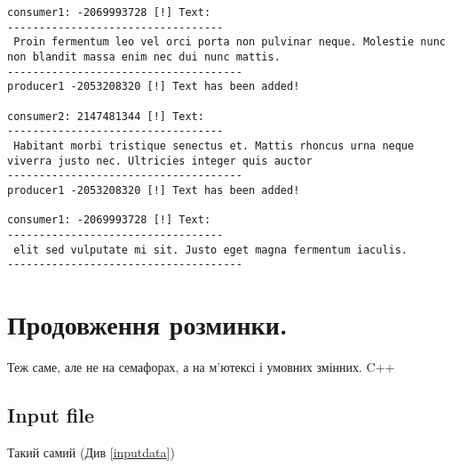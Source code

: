 \documentclass{article}
\begin{document}
\begin{verbatim}
consumer1: -2069993728 [!] Text: 
----------------------------------
 Proin fermentum leo vel orci porta non pulvinar neque. Molestie nunc non blandit massa enim nec dui nunc mattis. 
-------------------------------------
producer1 -2053208320 [!] Text has been added! 

consumer2: 2147481344 [!] Text: 
----------------------------------
 Habitant morbi tristique senectus et. Mattis rhoncus urna neque viverra justo nec. Ultricies integer quis auctor
-------------------------------------
producer1 -2053208320 [!] Text has been added! 

consumer1: -2069993728 [!] Text: 
----------------------------------
 elit sed vulputate mi sit. Justo eget magna fermentum iaculis.
-------------------------------------

\end{verbatim}


\newpage
\section{Продовження розминки.}
\large Теж саме, але не на семафорах, а на м’ютексі і
умовних змінних. 
C++

\subsection{Input file}

Такий самий (Див \ref{inputdata})
\end{document}
